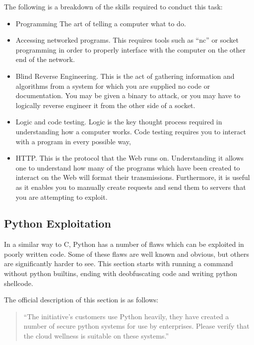 \documentclass[a4paper,11pt]{report}
\begin{document}
			The following is a breakdown of the skills required to conduct this task:
			\begin{itemize}
				\item Programming
					The art of telling a computer what to do. 
				\item Accessing networked programs. 
					This requires tools such as ``nc'' or socket programming in order to properly interface with the computer on the other end of the network. 
				\item Blind Reverse Engineering. 
					This is the act of gathering information and algorithms from a system for which you are supplied no code or documentation. 
					You may be given a binary to attack, or you may have to logically reverse engineer it from the other side of a socket. 
				\item Logic and code testing. 
					Logic is the key thought process required in understanding how a computer works. 
					Code testing requires you to interact with a program in every possible way, 
				\item HTTP. 
					This is the protocol that the Web runs on. 
					Understanding it allows one to understand how many of the programs which have been created to interact on the Web will format their transmissions. 
					Furthermore, it is useful as it enables you to manually create requests and send them to servers that you are attempting to exploit. 
			\end{itemize}

		\subsection{Python Exploitation}
			In a similar way to C, Python has a number of flaws which can be exploited in poorly written code. 
			Some of these flaws are well known and obvious, but others are significantly harder to see. 
			This section starts with running a command without python builtins, ending with deobfuscating code and writing python shellcode. 

			The official description of this section is as follows:
			\begin{quote}
				``The initiative's customers use Python heavily, they have created a number of secure python systems for use by enterprises. Please verify that the cloud wellness is suitable on these systems.''
			\end{quote}
\end{document}
